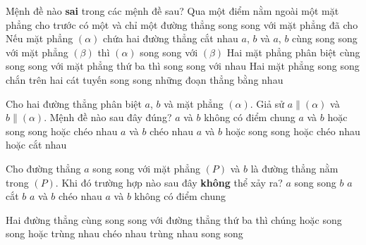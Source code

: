 	\begin{ex}%
		Mệnh đề nào \textbf{sai} trong các mệnh đề sau?
		\choice
		{\True Qua một điểm nằm ngoài một mặt phẳng cho trước có một và chỉ một đường thẳng song song với mặt phẳng đã cho}
		{Nếu mặt phẳng $(\alpha)$ chứa hai đường thẳng cắt nhau $a$, $b$ và $a$, $b$ cùng song song với mặt phẳng $(\beta)$ thì $(\alpha)$ song song với $(\beta)$}
		{Hai mặt phẳng phân biệt cùng song song với mặt phẳng thứ ba thì song song với nhau}
		{Hai mặt phẳng song song chắn trên hai cát tuyến song song những đoạn thẳng bằng nhau}
	\end{ex}

	\begin{ex}%
		Cho hai đường thẳng phân biệt $a$, $b$ và mặt phẳng $(\alpha)$. Giả sử $a \parallel (\alpha)$ và $b \parallel (\alpha)$. Mệnh đề nào sau đây đúng?
		\choice
		{$a$ và $b$ không có điểm chung}
		{$a$ và $b$ hoặc song song hoặc chéo nhau}
		{$a$ và $b$ chéo nhau}
		{\True $a$ và $b$ hoặc song song hoặc chéo nhau hoặc cắt nhau}
	\end{ex}

	\begin{ex}%
		Cho đường thẳng $a$ song song với mặt phẳng $(P)$ và $b$ là đường thẳng nằm trong $(P)$. Khi đó trường hợp nào sau đây \textbf{không} thể xảy ra?
		\choice
		{$a$ song song $b$}
		{\True $a$ cắt $b$}
		{$a$ và $b$ chéo nhau}
		{$a$ và $b$ không có điểm chung}
	\end{ex}

	\begin{ex}%
		Hai đường thẳng cùng song song với đường thẳng thứ ba thì chúng
		\choice
		{\True hoặc song song hoặc trùng nhau}
		{chéo nhau}
		{trùng nhau}
		{song song}
	\end{ex}

